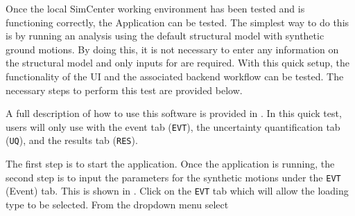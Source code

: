 Once the local SimCenter working environment has been tested and is
functioning correctly, the \texttt{\getsoftwarename{}} Application
can be tested. The simplest way to do this is by running an analysis
using the default structural model with synthetic ground motions. By
doing this, it is not necessary to enter any information on the
structural model and only inputs for
are required. With this quick setup, the
functionality of the \texttt{\getsoftwarename{}} UI and the associated backend
workflow can be tested. The necessary steps to perform this
test are provided below.

A full description of how to use this software is provided
in .  In this quick test, users will only
use with the event tab (\texttt{EVT}), the uncertainty
quantification tab (\texttt{UQ}), 
and the results tab (\texttt{RES}).

The first step is to start the \texttt{\getsoftwarename{}}
application.  Once the application is running, the second step is to
input the parameters for the synthetic motions under the \texttt{EVT}
(Event) tab. This is shown in . Click
on the \texttt{EVT} tab which will allow the loading type to be
selected. From the dropdown menu select 



